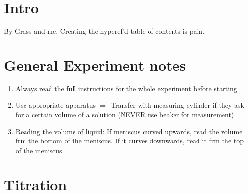 \documentclass[oneside]{book}
\begin{document}

\vspace{10mm}

\begingroup
\let\clearpage\relax
\chapter{Intro}
\endgroup

By Grass and me. Creating the hyperef'd table of contents is pain.

\tableofcontents

\mainmatter

\newpage
\chapter{General Experiment notes}
\setcounter{page}{3}
\begin{enumerate}
    \item Always read the full instructions for the whole experiment before starting
    \item Use appropriate apparatus \(\Rightarrow\) Transfer with measuring cylinder if they ask for a certain volume of a solution (NEVER use beaker for measurement)
    \item Reading the volume of liquid: \small If meniscus curved upwards, read the volume frm the bottom of the meniscus. If it curves downwards, read it frm the top of the meniscus. \normalsize
\end{enumerate}
\chapter{Titration}
\end{document}

